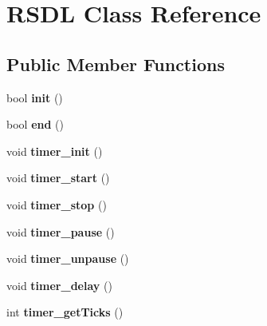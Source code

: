 \hypertarget{classRSDL}{
\section{RSDL Class Reference}
\label{classRSDL}
}
\subsection*{Public Member Functions}
\begin{DoxyCompactItemize}
\item 
\hypertarget{classRSDL_a1bf9913888b5c8a5cf3408d622fbc4c2}{
bool {\bfseries init} ()}
\label{classRSDL_a1bf9913888b5c8a5cf3408d622fbc4c2}

\item 
\hypertarget{classRSDL_af162a71862213d98bcf7c2c045b162f8}{
bool {\bfseries end} ()}
\label{classRSDL_af162a71862213d98bcf7c2c045b162f8}

\item 
\hypertarget{classRSDL_a42d46d15990b40c9f284c020c4b4a570}{
void {\bfseries timer\_\-init} ()}
\label{classRSDL_a42d46d15990b40c9f284c020c4b4a570}

\item 
\hypertarget{classRSDL_a5fe4f0e3ad791b582fed8036da944bb7}{
void {\bfseries timer\_\-start} ()}
\label{classRSDL_a5fe4f0e3ad791b582fed8036da944bb7}

\item 
\hypertarget{classRSDL_a019f225f982105d3baa7f3d531515bfa}{
void {\bfseries timer\_\-stop} ()}
\label{classRSDL_a019f225f982105d3baa7f3d531515bfa}

\item 
\hypertarget{classRSDL_a0d22c943a2153c17ea610ec2effe3a61}{
void {\bfseries timer\_\-pause} ()}
\label{classRSDL_a0d22c943a2153c17ea610ec2effe3a61}

\item 
\hypertarget{classRSDL_a9751e0e2414c8743539b0376215a047f}{
void {\bfseries timer\_\-unpause} ()}
\label{classRSDL_a9751e0e2414c8743539b0376215a047f}

\item 
\hypertarget{classRSDL_a7db68f9d5ed9f15976e7ba4829273927}{
void {\bfseries timer\_\-delay} ()}
\label{classRSDL_a7db68f9d5ed9f15976e7ba4829273927}

\item 
\hypertarget{classRSDL_a68f700744989ba43ff3885ce8a87cb7c}{
int {\bfseries timer\_\-getTicks} ()}
\label{classRSDL_a68f700744989ba43ff3885ce8a87cb7c}


\end{DoxyCompactItemize}
